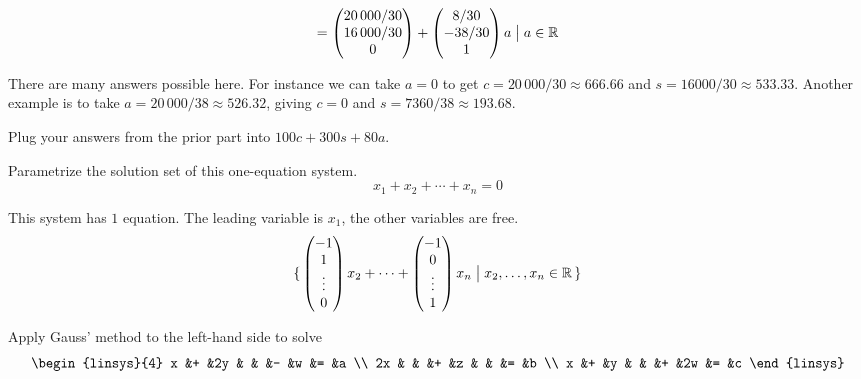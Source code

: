 \begin{exercises}
\begin{answer}
\begin{exparts}
\begin{equation*}
{                 =\begin{pmatrix} 20\,000/30 \\ 16\,000/30 \\ 0 \end{pmatrix}
                  +\begin{pmatrix} 8/30 \\ -38/30 \\ 1 \end{pmatrix}a
                 \bigm|a\in\mathbb{R}}
          \end{equation*}
        \item There are many answers possible here. 
          For instance we can take $a=0$ to get $c=20\,000/30\approx 666.66$ and
          $s=16000/30\approx 533.33$.
          Another example is to take $a=20\,000/38\approx 526.32$, giving
          $c=0$ and $s=7360/38\approx 193.68$.
        \item Plug your answers from the prior part into 
          $100c+300s+80a$.
      \end{exparts}
    \end{answer}
  \item 
    Parametrize the solution set of this one-equation system.
    \begin{equation*}
      x_1+x_2+\cdots+x_n=0
    \end{equation*}
    \begin{answer}
      This system has \( 1 \) equation.
      The leading variable is \( x_1 \), the other variables are free.
      \begin{equation*}
        \mbox{$\{\,\begin{pmatrix} -1 \\ 1 \\ \vdots \\ 0 \end{pmatrix}x_2
             +\cdots+
             \begin{pmatrix} -1 \\ 0 \\ \vdots \\ 1 \end{pmatrix}x_n
             \bigm| x_2,\ldots,x_n\in\mathbb{R}\,\}$}
      \end{equation*}  
     \end{answer}
  \recommended \item 
    \begin{exparts}
    \partsitem Apply Gauss' method to the left-hand side to solve
      \begin{equation*}
        \begin{linsys}{4}
          x  &+  &2y  &    &    &-   &w   &=   &a   \\
         2x  &   &    &+   &z   &    &    &=   &b   \\
          x  &+  &y   &    &    &+   &2w  &=   &c   
        \end{linsys}
      \end{equation*}

\end{exparts}
\end{exercises}
